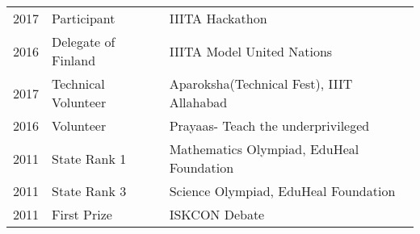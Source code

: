 \documentclass[12pt]{deedy-resume-openfont}
\begin{document}
\begin{tabular}{rll}
\vspace{\topsep} 
2017 	& Participant    & IIITA Hackathon\\
\vspace{\topsep} 
2016   & Delegate of Finland   & IIITA Model United Nations\\
\vspace{\topsep}
2017   &  Technical Volunteer  & Aparoksha(Technical Fest), IIIT Allahabad\\
\vspace{\topsep}
2016   &  Volunteer   & Prayaas- Teach the underprivileged\\
\vspace{\topsep}
2011 	& State Rank 1    & Mathematics Olympiad, EduHeal Foundation\\
\vspace{\topsep}
2011   & State Rank 3  & Science Olympiad, EduHeal Foundation\\
\vspace{\topsep}
2011   &  First Prize  & ISKCON Debate\\\end{tabular}
\sectionsep
\end{document}
